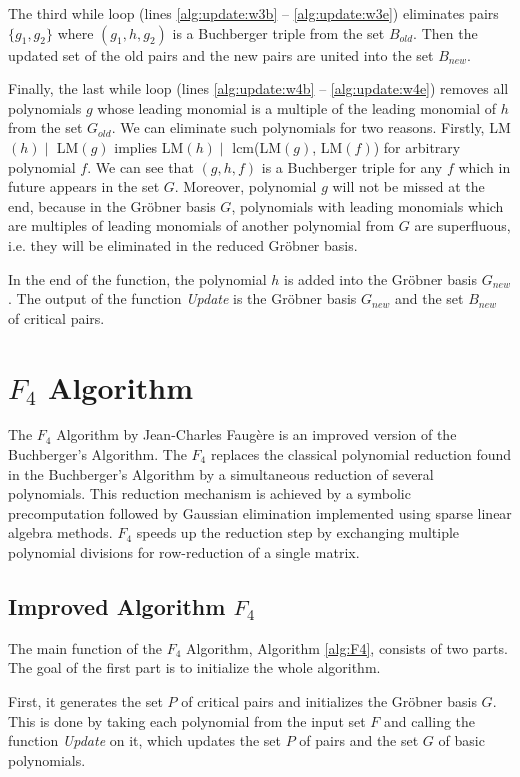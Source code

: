 The third while loop (lines \ref{alg:update:w3b} -- \ref{alg:update:w3e}) eliminates pairs $\{g_1, g_2\}$ where $(g_1, h, g_2)$ is a Buchberger triple from the set $B_{old}$. Then the updated set of the old pairs and the new pairs are united into the set $B_{new}$.

Finally, the last while loop (lines \ref{alg:update:w4b} -- \ref{alg:update:w4e}) removes all polynomials $g$ whose leading monomial is a multiple of the leading monomial of $h$ from the set $G_{old}$. We can eliminate such polynomials for two reasons. Firstly, LM$(h) \mid$ LM$(g)$ implies LM$(h) \mid$ lcm(LM$(g)$, LM$(f)$) for arbitrary polynomial $f$. We can see that $(g, h, f)$ is a Buchberger triple for any $f$ which in future appears in the set $G$. Moreover, polynomial $g$ will not be missed at the end, because in the Gr\"obner basis $G$, polynomials with leading monomials which are multiples of leading monomials of another polynomial from $G$ are superfluous, i.e. they will be eliminated in the reduced Gr\"obner basis.

In the end of the function, the polynomial $h$ is added into the Gr\"obner basis $G_{new}$. The output of the function \textit{Update} is the Gr\"obner basis $G_{new}$ and the set $B_{new}$ of critical pairs.



\section{$F_4$ Algorithm}
\label{sec:F4}
The $F_4$ Algorithm \cite{F4} by Jean-Charles Faug\`ere is an improved version of the Buchberger's Algorithm. The $F_4$ replaces the classical polynomial reduction found in the Buchberger's Algorithm by a simultaneous reduction of several polynomials. This reduction mechanism is achieved by a symbolic precomputation followed by Gaussian elimination implemented using sparse linear algebra methods. $F_4$ speeds up the reduction step by exchanging multiple polynomial divisions for row-reduction of a single matrix.

\subsection{Improved Algorithm $F_4$}
The main function of the $F_4$ Algorithm, Algorithm \ref{alg:F4}, consists of two parts. The goal of the first part is to initialize the whole algorithm.

First, it generates the set $P$ of critical pairs and initializes the Gr\"obner basis $G$. This is done by taking each polynomial from the input set $F$ and calling the function \textit{Update} on it, which updates the set $P$ of pairs and the set $G$ of basic polynomials.

